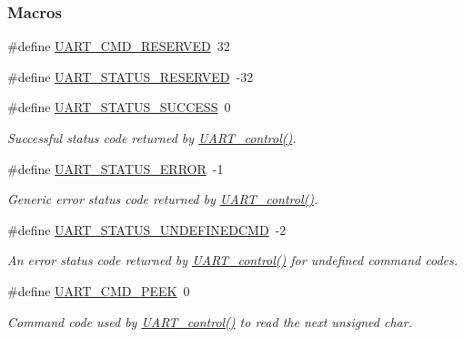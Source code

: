 \subsubsection*{Macros}
\begin{DoxyCompactItemize}
\item 
\#define \hyperlink{_u_a_r_t_8h_a0f5a809e0884da33fef102236eb51644}{U\+A\+R\+T\+\_\+\+C\+M\+D\+\_\+\+R\+E\+S\+E\+R\+V\+E\+D}~32
\item 
\#define \hyperlink{_u_a_r_t_8h_a8f35027907fbab6a9ee302d2ee52a879}{U\+A\+R\+T\+\_\+\+S\+T\+A\+T\+U\+S\+\_\+\+R\+E\+S\+E\+R\+V\+E\+D}~-\/32
\item 
\#define \hyperlink{_u_a_r_t_8h_a101b7761f89b3ec49f0c6726669acfed}{U\+A\+R\+T\+\_\+\+S\+T\+A\+T\+U\+S\+\_\+\+S\+U\+C\+C\+E\+S\+S}~0
\begin{DoxyCompactList}\small\item\em Successful status code returned by \hyperlink{_u_a_r_t_8h_a9de3c26cfe4ce6b7f350a6ea6e16801d}{U\+A\+R\+T\+\_\+control()}. \end{DoxyCompactList}\item 
\#define \hyperlink{_u_a_r_t_8h_a2ae076f4aae13ca8e2aea674207df0ad}{U\+A\+R\+T\+\_\+\+S\+T\+A\+T\+U\+S\+\_\+\+E\+R\+R\+O\+R}~-\/1
\begin{DoxyCompactList}\small\item\em Generic error status code returned by \hyperlink{_u_a_r_t_8h_a9de3c26cfe4ce6b7f350a6ea6e16801d}{U\+A\+R\+T\+\_\+control()}. \end{DoxyCompactList}\item 
\#define \hyperlink{_u_a_r_t_8h_a61125a2eb8059fd8b96ad95edc68ac2b}{U\+A\+R\+T\+\_\+\+S\+T\+A\+T\+U\+S\+\_\+\+U\+N\+D\+E\+F\+I\+N\+E\+D\+C\+M\+D}~-\/2
\begin{DoxyCompactList}\small\item\em An error status code returned by \hyperlink{_u_a_r_t_8h_a9de3c26cfe4ce6b7f350a6ea6e16801d}{U\+A\+R\+T\+\_\+control()} for undefined command codes. \end{DoxyCompactList}\item 
\#define \hyperlink{_u_a_r_t_8h_a942596a37cb2109ae021f88f3d907bdc}{U\+A\+R\+T\+\_\+\+C\+M\+D\+\_\+\+P\+E\+E\+K}~0
\begin{DoxyCompactList}\small\item\em Command code used by \hyperlink{_u_a_r_t_8h_a9de3c26cfe4ce6b7f350a6ea6e16801d}{U\+A\+R\+T\+\_\+control()} to read the next unsigned char. \end{DoxyCompactList}\item 

\end{DoxyCompactItemize}
